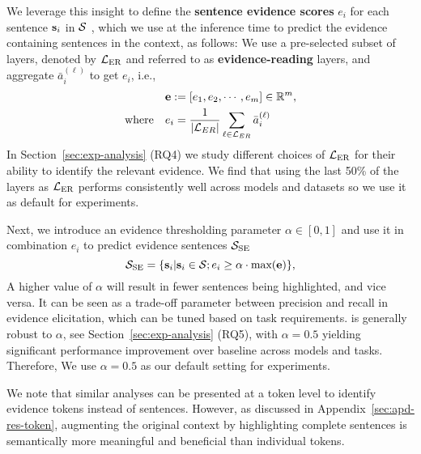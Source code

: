 We leverage this insight to define the \textbf{sentence evidence scores} $e_i$ for each sentence ${\mathbf{s}}_i$ in ${\mathcal{S}}$ , which we use at the inference time to predict the evidence containing sentences in the context, as follows: We use a pre-selected subset of layers, denoted by ${\mathcal{L}}_\text{ER}$ and referred to as \textbf{evidence-reading} layers, and aggregate $\bar{a}_i^{(\ell)}$ to get $e_i$, i.e., 
\begin{equation}
\label{eq:evd-score}
    \begin{aligned}
    &{\mathbf{e}} := [e_1, e_2, \cdots, e_m] \in \mathbb{R}^m, \\
    \text{where} \quad & e_i =  \frac{1}{|{\mathcal{L}}_{ER}|} \sum\limits_{\ell \in {\mathcal{L}}_{ER}} \bar{a}_i^{(\ell)}
    \end{aligned}
\end{equation}
In Section~\ref{sec:exp-analysis} (RQ4) we study different choices of ${\mathcal{L}}_\text{ER}$ for their ability to identify the relevant evidence. We find that using the last 50\% of the layers as ${\mathcal{L}}_\text{ER}$ performs consistently well across models and datasets so we use it as default for experiments.


Next, we introduce an evidence thresholding parameter $\alpha \in [0, 1]$ and use it in combination $e_i$ to predict evidence sentences ${\mathcal{S}}_\text{SE}$
\begin{equation}
\label{eq:threshold}
    {\mathcal{S}}_\text{SE} = \{{\mathbf{s}}_i | {\mathbf{s}}_i \in {\mathcal{S}}; e_i \geq \alpha \cdot \text{max}({\mathbf{e}})\},
\end{equation}
A higher value of $\alpha$ will result in fewer sentences being highlighted, and vice versa. It can be seen as a trade-off parameter between precision and recall in evidence elicitation, which can be tuned based on task requirements. \se is generally robust to $\alpha$, see Section~\ref{sec:exp-analysis} (RQ5), with $\alpha=0.5$ yielding significant performance improvement over baseline across models and tasks. Therefore, We use $\alpha=0.5$ as our default setting for experiments. 

We note that similar analyses can be presented at a token level to identify evidence tokens instead of sentences. However, as discussed in Appendix~\ref{sec:apd-res-token}, augmenting the original context by highlighting complete sentences is semantically more meaningful and beneficial than individual tokens.
